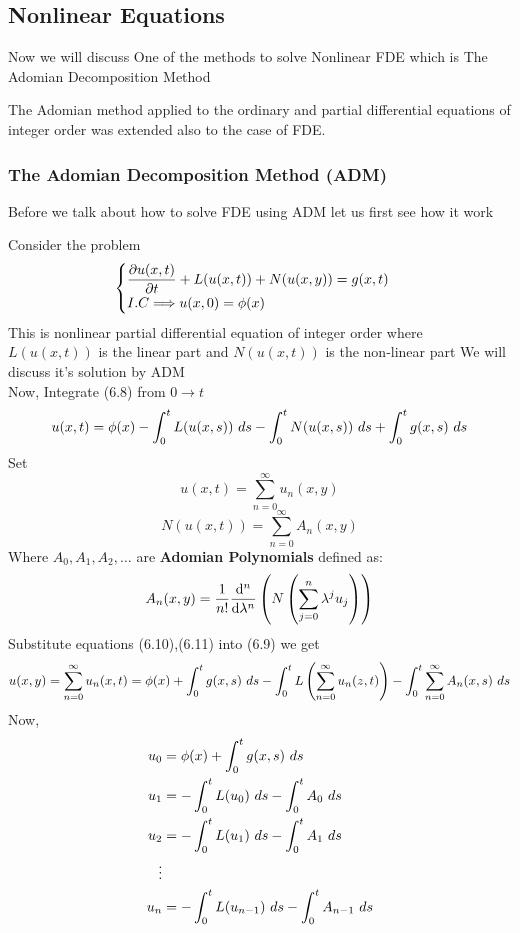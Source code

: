 \subsection{Nonlinear Equations}
Now we will discuss One of the methods to solve Nonlinear FDE which is The Adomian Decomposition Method

The Adomian method applied to the ordinary and partial differential equations of integer order was extended 
also to the case of FDE.
\subsubsection{The Adomian Decomposition Method (ADM)}
Before we talk about how to solve FDE using ADM let us first see how it work 

Consider the problem
\begin{equation}
    \begin{cases}
        \displaystyle \pdv{u(x,t)}{t} + L(u(x,t)) + N(u(x,y)) = g(x,t)
        \\
        I.C \Longrightarrow \displaystyle u(x,0) = \phi(x)
    \end{cases}
\end{equation}
This is nonlinear partial differential equation of integer order where $L(u(x,t))$ is the linear part and $N(u(x,t))$ is the non-linear part
We will discuss it's solution by ADM
\\
Now, Integrate (6.8) from $0 \to t$
\begin{equation}
    u(x,t) = \phi(x) - \int_{0}^{t} L(u(x,s)) \,\, ds  - \int_{0}^{t} N(u(x,s)) \,\, ds  + \int_{0}^{t} g(x,s) \,\, ds
\end{equation}
Set
\begin{equation}
    u(x,t) = \sum_{n=0}^{\infty} u_n(x,y)
\end{equation}
\begin{equation}
    N(u(x,t)) = \sum_{n=0}^{\infty} A_n(x,y)
\end{equation}
Where $A_0,A_1,A_2,\dots$ are \textbf{Adomian Polynomials} defined as:
\[
    A_n(x,y) = \frac{1}{n!} \dv[n]{}{\lambda} \left( N \left( \sum_{j=0}^{n}\lambda^j u_j \right) \right)
\]
Substitute equations (6.10),(6.11) into (6.9) we get
\begin{equation*}
    u(x,y) = \sum_{n=0}^{\infty}u_n(x,t) = \phi(x) + \int_0^t g(x,s) \,\, ds - \int_0^t L \left(\sum_{n=0}^{\infty}u_n(z,t)\right)  - \int_0^t \sum_{n=0}^{\infty}A_n(x,s) \,\, ds
\end{equation*}
Now,
\begin{align*}
    u_0 & = \phi(x) + \int_0^t g(x,s) \,\, ds                 \\
    u_1 & = -\int_0^t L(u_0) \,\, ds - \int_0^t A_0 \,\, ds         \\
    u_2 & = -\int_0^t L(u_1) \,\, ds - \int_0^t A_1 \,\, ds         \\
    \vdots                                               \\
    u_n & = -\int_0^t L(u_{n-1}) \,\, ds - \int_0^t A_{n-1} \,\, ds
\end{align*}
